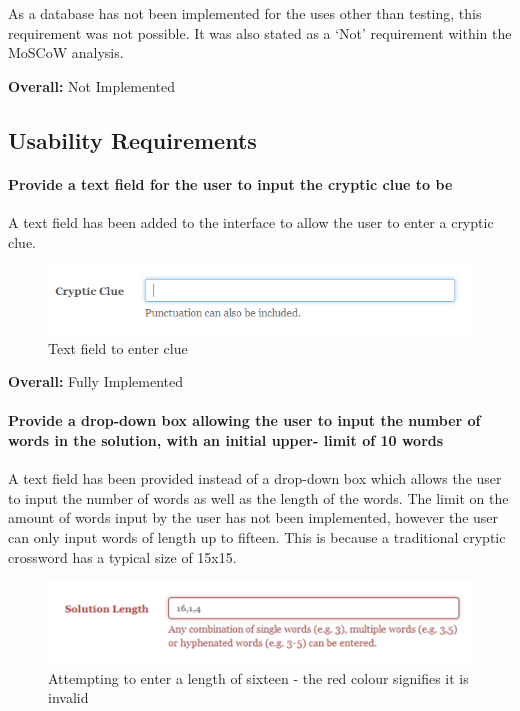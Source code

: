 As a database has not been implemented for the uses other than testing, 
this requirement was not possible. It was also stated as a `Not' requirement 
within the MoSCoW analysis. 

{\bf Overall:} Not Implemented

\subsection{Usability Requirements}
\label{sub:test_func_usability}

 \paragraph{Provide a text field for the user to input the cryptic clue to be}
  A text field has been added to the interface to allow the user to enter a cryptic clue. 
\begin{figure}[H]
	\centering
	 \includegraphics[keepaspectratio=true]{evidence/enterclue.png}
	\caption{Text field to enter clue}
\end{figure}

{\bf Overall:} Fully Implemented

 \paragraph{Provide a drop-down box allowing the user to input the
number of words in the solution, with an initial upper-
limit of 10 words}

 A text field has been provided instead of a drop-down box which allows the user
 to input the number of words as well as the length of the words. The limit on the 
amount of words input by the user has not been implemented, however the user 
can only input words of length up to fifteen. This is because a traditional cryptic 
crossword has a typical size of 15x15.

\begin{figure}[H]
	\centering
	\includegraphics[keepaspectratio=true]{evidence/dropdown1.png}
	\caption{Attempting to enter a length of sixteen - the red colour signifies it is invalid}
\end{figure}

